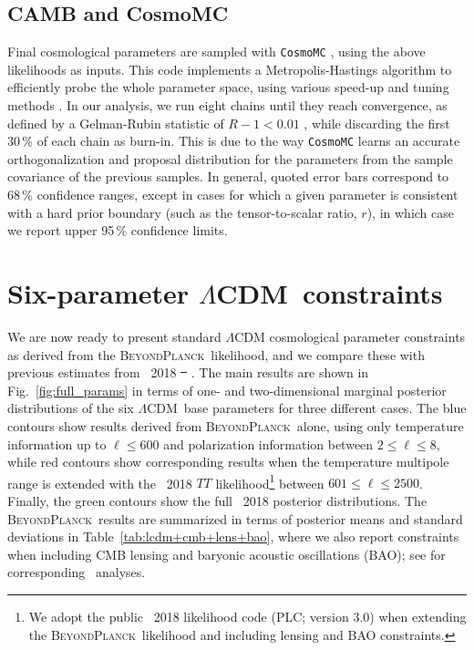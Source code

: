 \documentclass[twocolumn]{aa}
\def\LCDM{$\Lambda$CDM}
\newcommand{\BP}{\textsc{BeyondPlanck}}
\providecommand{\DIFaddtex}[1]{{\protect\color{blue}\uwave{#1}}} %
\providecommand{\DIFdeltex}[1]{{\protect\color{red}\sout{#1}}}                      %
\providecommand{\DIFaddbegin}{} %
\providecommand{\DIFaddend}{} %
\providecommand{\DIFdelbegin}{} %
\providecommand{\DIFdelend}{} %
\providecommand{\DIFadd}[1]{\texorpdfstring{\DIFaddtex{#1}}{#1}} %
\providecommand{\DIFdel}[1]{\texorpdfstring{\DIFdeltex{#1}}{}} %
\newcommand{\DIFscaledelfig}{0.5}
\newlength{\DIFdelgraphicswidth} %
\newlength{\DIFdelgraphicsheight} %
\newcommand{\DIFaddincludegraphics}[2][]{{\color{blue}\fbox{\DIFOincludegraphics[#1]{#2}}}} %
\newcommand{\DIFdelincludegraphics}[2][]{%
\sbox{\DIFdelgraphicsbox}{\DIFOincludegraphics[#1]{#2}}%
\settoboxwidth{\DIFdelgraphicswidth}{\DIFdelgraphicsbox} %
\settoboxtotalheight{\DIFdelgraphicsheight}{\DIFdelgraphicsbox} %
\scalebox{\DIFscaledelfig}{%
\parbox[b]{\DIFdelgraphicswidth}{\usebox{\DIFdelgraphicsbox}\\[-\baselineskip] \rule{\DIFdelgraphicswidth}{0em}}\llap{\resizebox{\DIFdelgraphicswidth}{\DIFdelgraphicsheight}{%
\setlength{\unitlength}{\DIFdelgraphicswidth}%
\begin{picture}(1,1)%
\thicklines\linethickness{2pt} %
{\color[rgb]{1,0,0}\put(0,0){\framebox(1,1){}}}%
{\color[rgb]{1,0,0}\put(0,0){\line( 1,1){1}}}%
{\color[rgb]{1,0,0}\put(0,1){\line(1,-1){1}}}%
\end{picture}%
}\hspace*{3pt}}} %
} %
\DeclareRobustCommand{\DIFaddbegin}{\DIFOaddbegin \let\includegraphics\DIFaddincludegraphics} %
\DeclareRobustCommand{\DIFaddend}{\DIFOaddend \let\includegraphics\DIFOincludegraphics} %
\DeclareRobustCommand{\DIFdelbegin}{\DIFOdelbegin \let\includegraphics\DIFdelincludegraphics} %
\DeclareRobustCommand{\DIFdelend}{\DIFOaddend \let\includegraphics\DIFOincludegraphics} %
\begin{document}
\subsection{CAMB and CosmoMC}
Final cosmological parameters are sampled with \texttt{CosmoMC}
\citep{cosmomc}, using the above likelihoods as inputs. This code
implements a Metropolis-Hastings algorithm to efficiently probe the
whole parameter space, using various speed-up and tuning methods
\citep{neal2005,lewis2013b}. In our analysis, we run eight chains
until they reach convergence, as defined by a Gelman-Rubin statistic
of $R-1<0.01$ \citep{gelman:1992}, while discarding the first 30\,\%
of each chain as burn-in. This is due to the way \texttt{CosmoMC}
learns an accurate orthogonalization and proposal distribution for the
parameters from the sample covariance of the previous samples. In
general, quoted error bars correspond to 68\,\% confidence ranges,
except in cases for which a given parameter is consistent with a hard
prior boundary (such as the tensor-to-scalar ratio, $r$), in which
case we report upper 95\,\% confidence limits. 

\section{Six-parameter \LCDM\ constraints}
\label{sec:LCDM_constraints}

We are now ready to present standard $\Lambda$CDM cosmological
parameter constraints as derived from the \BP\ likelihood, and we
compare these with previous estimates from \Planck\ 2018
\DIFdelbegin \DIFdel{\mbox{%
\citep{planck2016-l05}}\hspace{0pt}%
}\DIFdelend \DIFaddbegin \DIFadd{\mbox{%
\citep{planck2016-l06}}\hspace{0pt}%
}\DIFaddend . The main results are shown in
Fig.~\ref{fig:full_params} in terms of one- and two-dimensional
marginal posterior distributions of the six \LCDM\ base parameters for
three different cases. The blue contours show results derived from
\BP\ alone, using only temperature information up to $\ell\le600$ and
polarization information between $2\le\ell\le 8$, while red contours
show corresponding results when the temperature multipole range is
extended with the \Planck\ 2018 $TT$ likelihood\footnote{We adopt the
public \Planck\ 2018 likelihood code (PLC; version 3.0) when
extending the \BP\ likelihood and including lensing and BAO
constraints.} between $601\le\ell\le2500$. Finally, the green contours
show the full \Planck\ 2018 \DIFaddbegin \DIFadd{(TT + lowE) }\DIFaddend posterior distributions. The \BP\ results
are summarized in terms of posterior means and standard deviations in
Table~\ref{tab:lcdm+cmb+lens+bao}, where we also report constraints
when including CMB lensing and baryonic
acoustic oscillations (BAO); see \citep{planck2013-p11,
planck2014-a15} for corresponding \Planck\ analyses. 
\end{document}
